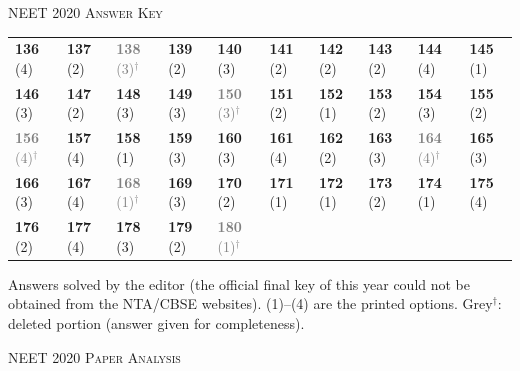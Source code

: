 \par{}\vspace{14pt}
\begin{center}{}\par
{\large\color{navy}\scshape NEET 2020 \textperiodcentered{} Answer Key}\end{center}
{\small\setlength{\tabcolsep}{1pt}\renewcommand{\arraystretch}{1.5}
\begin{tabularx}{\linewidth}{@{}*{10}{>{\centering\arraybackslash}X}@{}}\toprule
\textbf{136}\,(4) & \textbf{137}\,(2) & \textcolor{gray}{\textbf{138}\,(3)$^{\dagger}$} & \textbf{139}\,(2) & \textbf{140}\,(3) & \textbf{141}\,(2) & \textbf{142}\,(2) & \textbf{143}\,(2) & \textbf{144}\,(4) & \textbf{145}\,(1)\\
\textbf{146}\,(3) & \textbf{147}\,(2) & \textbf{148}\,(3) & \textbf{149}\,(3) & \textcolor{gray}{\textbf{150}\,(3)$^{\dagger}$} & \textbf{151}\,(2) & \textbf{152}\,(1) & \textbf{153}\,(2) & \textbf{154}\,(3) & \textbf{155}\,(2)\\
\textcolor{gray}{\textbf{156}\,(4)$^{\dagger}$} & \textbf{157}\,(4) & \textbf{158}\,(1) & \textbf{159}\,(3) & \textbf{160}\,(3) & \textbf{161}\,(4) & \textbf{162}\,(2) & \textbf{163}\,(3) & \textcolor{gray}{\textbf{164}\,(4)$^{\dagger}$} & \textbf{165}\,(3)\\
\textbf{166}\,(3) & \textbf{167}\,(4) & \textcolor{gray}{\textbf{168}\,(1)$^{\dagger}$} & \textbf{169}\,(3) & \textbf{170}\,(2) & \textbf{171}\,(1) & \textbf{172}\,(1) & \textbf{173}\,(2) & \textbf{174}\,(1) & \textbf{175}\,(4)\\
\textbf{176}\,(2) & \textbf{177}\,(4) & \textbf{178}\,(3) & \textbf{179}\,(2) & \textcolor{gray}{\textbf{180}\,(1)$^{\dagger}$} &  &  &  &  & \\\bottomrule\end{tabularx}}\par\smallskip
{\footnotesize Answers solved by the editor (the official final key of this year could not be obtained from the NTA/CBSE websites). (1)--(4) are the printed options. {\color{gray}Grey$^{\dagger}$}: deleted portion (answer given for completeness).\par
}\par
\clearpage
\begin{center}{}\par
{\fontsize{20}{24}\selectfont\color{navy}\scshape NEET 2020 \textperiodcentered{} Paper Analysis}\par
{\color{gilt}}\end{center}
